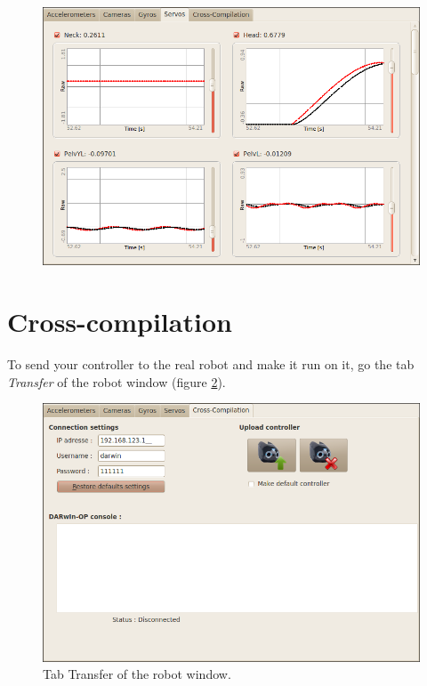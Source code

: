 \documentclass[a4paper, 12pt]{article}  		%
\begin{document}
\begin{figure}[H]
\begin{center}
\includegraphics[width=14cm]{window_servos.png}
\label{window_servos}
\end{center}
\end{figure}



\newpage
\section{Cross-compilation}

To send your controller to the real robot and make it run on it, go the tab \textit{Transfer} of the robot window (figure \ref{window_cross}).

\begin{figure}[H]
\begin{center}
\includegraphics[width=13cm]{window_cross.png}
\caption{Tab Transfer of the robot window.}
\label{window_cross}
\end{center}
\end{figure}
\end{document}
